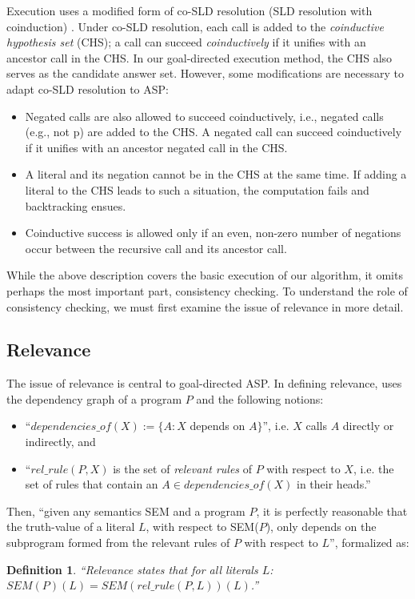 \documentclass{new_tlp}
\newtheorem{definition}{Definition}
\begin{document}
Execution uses a modified form of co-SLD resolution (SLD resolution with 
coinduction) \cite{coinduction}. Under co-SLD resolution, each call is added to 
the \textit{coinductive hypothesis set} (CHS); a call can succeed 
{\it coinductively} if it unifies with an ancestor call in the CHS. In our 
goal-directed execution method, the CHS also serves as the candidate answer set.
However, some modifications are necessary to adapt co-SLD resolution to ASP:
\begin{itemize}
\item Negated calls are also allowed to succeed coinductively, i.e., negated
calls (e.g., not p) are added to the CHS. A negated call can
succeed coinductively if it unifies with an ancestor negated call in the CHS.
\item A literal and its negation cannot be in the CHS at the same time. If 
adding a literal to the CHS leads to such a situation, the computation fails 
and backtracking ensues.
\item Coinductive success is allowed only if an even, non-zero number of 
 negations occur between the recursive call and its ancestor call.
\end{itemize}


While the above description covers the basic execution of our algorithm, it 
omits perhaps the most important part, consistency checking. To understand the 
role of consistency checking, we must first examine the issue of relevance in 
more detail.

\subsection{Relevance} \label{sec:relevance}

The issue of relevance is central to goal-directed ASP. In defining relevance,
\cite{dix95} uses the dependency graph of a program $P$ and the following
notions:
\begin{itemize}
\item ``$dependencies\_of(X) := \{ A : X$ depends on $A \}$'', i.e. $X$ calls 
$A$ directly or indirectly, and
\item ``$rel\_rule(P,X)$ is the set of \textit{relevant rules} of $P$ with 
respect to $X$, i.e. the set of rules that contain an
$A \in dependencies\_of(X)$ in their heads.''
\end{itemize}
Then, ``given any semantics SEM and a program $P$, it is perfectly reasonable 
that the truth-value of a literal $L$, with respect to SEM($P$), only depends 
on the subprogram formed from the relevant rules of $P$ with respect to $L$'', 
formalized as:
\begin{definition} \label{def:relevance}
``Relevance states that for all literals $L$:
$SEM(P)(L) = SEM(rel\_rule(P,L))(L )$.'' \cite{dix95}
\end{definition}
\end{document}
